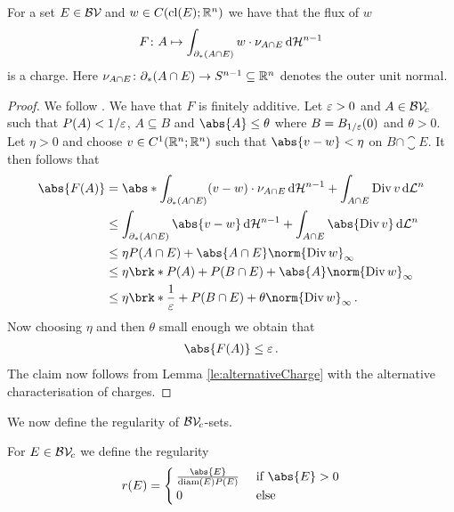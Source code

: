 \begin{claim}
For a set $E\in\mathcal{BV\!}$  and $w\in C(\operatorname{cl}(E);\mathbb{R}^n)$ we have that the flux of $w$
\begin{align*}
	F\colon A\mapsto \int_{\partial_*(A\cap E)}w\cdot\nu_{A\cap E}\,\mathrm{d} \mathcal{H}^{n-1}
\end{align*}
is a charge. Here $\nu_{A\cap E}\colon \partial_*(A\cap E)\to S^{n-1}\subseteq\mathbb{R}^n$ denotes the outer unit normal.
\end{claim}
\begin{proof}
We follow \cite[Example 2.1.4]{Pfe2001}.
We have that $F$ is finitely additive. Let $\varepsilon>0$ and $A\in\mathcal{BV\!}_c$ such that $P(A)<1/\varepsilon$, $A\subseteq B$ and $\abs{A}\leq \theta$ where $B=B_{1/\varepsilon}(0)$ and $\theta>0$. Let $\eta>0$ and choose $v\in C^1(\mathbb{R}^n;\mathbb{R}^n)$ such that $\abs{v-w}<\eta$ on $B\cap\closure E$. It then follows that
\begin{align*}
	\abs{F(A)}
	&= \abs*{\int_{\partial_*(A\cap E)}(v-w)\cdot\nu_{A\cap E}\dif\cH^{n-1}+\int_{A\cap E}\diver v\dif\cL^n} \\
	&\leq \int_{\partial_*(A\cap E)}\abs{v-w}\dif\cH^{n-1}+\int_{A\cap E}\abs{\diver v}\dif\cL^n \\
	&\leq \eta P(A\cap E)+\abs{A\cap E}\norm{\diver w}_\infty \\
	&\leq \eta \brk*{P(A)+P(B\cap E)}+\abs{A}\norm{\diver w}_\infty \\
	&\leq \eta\brk*{\frac{1}{\e}+P(B\cap E)}+\theta\norm{\diver w}_\infty\,.
\end{align*}
Now choosing $\eta$ and then $\theta$ small enough we obtain that
\begin{align*}
	\abs{F(A)}\leq \e\,.
\end{align*}
The claim now follows from Lemma \ref{le:alternativeCharge} with the alternative characterisation of charges.
\end{proof}

We now define the regularity of $\mathcal{BV\!}_c$-sets.

\begin{definition}
For $E\in \mathcal{BV\!}_c$ we define the regularity
\begin{align*}
	r(E)=\begin{cases}
		\frac{\abs{E}}{\diam(E)P(E)} &\text{ if }\abs{E}>0 \\
		0 &\text{ else}
	\end{cases}
\end{align*}
\end{definition}

